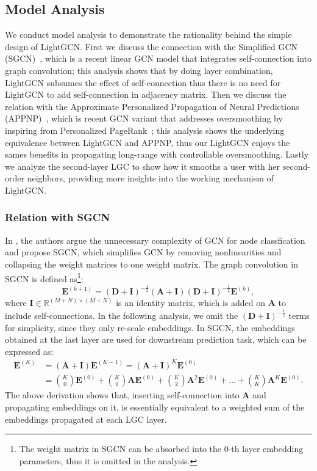 \documentclass[sigconf]{acmart}
\theoremstyle{definition}
\begin{document}
\subsection{Model Analysis}
We conduct model analysis to demonstrate the rationality behind the simple design of LightGCN. 
First we discuss the connection with the Simplified GCN (SGCN)~\cite{SGCN}, which is a recent linear GCN model that integrates self-connection into graph convolution; this analysis shows that by doing layer combination, LightGCN subsumes the effect of self-connection thus there is no need for LightGCN to add self-connection in adjacency matrix. 
Then we discuss the relation with the Approximate Personalized Propagation of Neural Predictions (APPNP)~\cite{ICLR19-APPNP}, which is recent GCN variant that addresses oversmoothing by inspiring from Personalized PageRank~\cite{haveliwala2002topic}; this analysis shows the underlying equivalence between LightGCN and APPNP, thus our LightGCN enjoys the sames benefits in propagating long-range with controllable oversmoothing. 
Lastly we analyze the second-layer LGC to show how it smooths a user with her second-order neighbors, providing more insights into the working mechanism of LightGCN.  

\subsubsection{Relation with SGCN}\label{ss:relation-sgcn} In \cite{SGCN}, the authors argue the unnecessary complexity of GCN for node classfication and propose SGCN, which simplifies GCN by removing nonlinearities and collapsing the weight matrices to one weight matrix. The graph convolution in SGCN is defined as\footnote{The weight matrix in SGCN can be absorbed into the 0-th layer embedding parameters, thus it is omitted in the analysis.}:
\begin{equation}
    \textbf{E}^{(k+1)} = (\textbf{D}+\textbf{I})^{-\frac{1}{2}} (\textbf{A}+\textbf{I}) (\textbf{D}+\textbf{I})^{-\frac{1}{2}} \textbf{E}^{(k)},
\end{equation}
where $\textbf{I}\in \mathbb{R}^{(M+N)\times (M+N)}$ is an identity matrix, which is added on $\textbf{A}$ to include self-connections. 
In the following analysis, we omit the $(\textbf{D}+\textbf{I})^{-\frac{1}{2}}$ terms for simplicity, since they only re-scale embeddings. In SGCN, the embeddings obtained at the last layer are used for downstream prediction task, which can be expressed as:
\begin{equation}\label{eq:SGCN}
\begin{aligned}
    \textbf{E}^{(K)} &= (\textbf{A}+\textbf{I}) \textbf{E}^{(K-1)} = (\textbf{A}+\textbf{I})^K \textbf{E}^{(0)} \\
    &= \binom{K}{0}\textbf{E}^{(0)} + \binom{K}{1} \textbf{A} \textbf{E}^{(0)} + \binom{K}{2} \textbf{A}^2 \textbf{E}^{(0)} + ... + \binom{K}{K} \textbf{A}^K \textbf{E}^{(0)}.
\end{aligned}
\end{equation}
The above derivation shows that, inserting self-connection into $\textbf{A}$ and propagating embeddings on it, is essentially equivalent to a weighted sum of the embeddings propagated at each LGC layer. 
\end{document}

